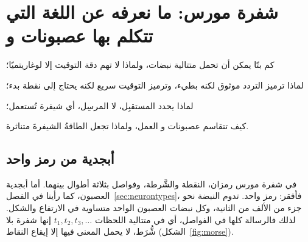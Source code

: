 \chapter{شفرة مورس: ما نعرفه عن اللغة التي تتكلم بها عصبونات  و}
\label{sec:code}
\begin{chaptergoals}
\item كم بتًا يمكن أن تحمل متتالية نبضات، ولماذا لا تهم دقة التوقيت إلا لوغاريتميًا؛
\item لماذا ترميز التردد موثوق لكنه بطيء، وترميز التوقيت سريع لكنه يحتاج إلى نقطة بدء؛
\item لماذا يحدد المستقبِل، لا المرسِل، أي شيفرة تُستعمل؛
\item كيف تتقاسم عصبونات  و العمل، ولماذا تجعل الطاقةُ الشيفرةَ متناثرة.
\end{chaptergoals}

\section{أبجدية من رمز واحد}

في شفرة مورس رمزان، النقطة والشَّرطة، وفواصل بثلاثة أطوال بينهما. أما أبجدية العصبون، كما رأينا في الفصل~\ref{sec:neurontypes}، فأفقر: رمز واحد. تدوم النبضة نحو جزء من الألف من الثانية، وكل نبضات العصبون الواحد متساوية في الارتفاع والشكل. لذلك فالرسالة كلها في الفواصل، أي في متتالية اللحظات $t_1,t_2,t_3,\dots$ إنها شفرة بلا شُّرَط، لا يحمل المعنى فيها إلا إيقاع النقاط (الشكل~\ref{fig:morse}).

